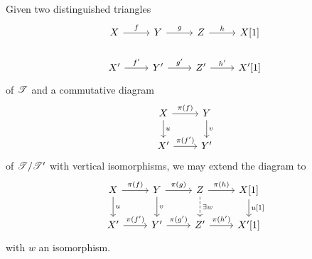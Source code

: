 \documentclass[dissertation.tex]{subfiles}
\begin{document}
\begin{lem}
  Given two distinguished triangles
  $$\begin{tikzcd}
    X \arrow{r}{f} & Y \arrow{r}{g} & Z \arrow{r}{h} & X[1]\\
    X^\prime \arrow{r}{f^\prime} & Y^\prime \arrow{r}{g^\prime} & Z^\prime \arrow{r}{h^\prime} & X^\prime[1]
  \end{tikzcd}$$
  of $\mathscr{T}$ and a commutative diagram
  $$\begin{tikzcd}
    X \arrow{r}{\pi(f)}\arrow{d}{u} & Y\arrow{d}{v}\\
    X^\prime \arrow{r}{\pi(f^\prime)} & Y^\prime
  \end{tikzcd}$$
  of $\mathscr{T}/\mathscr{T}^\prime$ with vertical isomorphisms, we may extend the diagram to 
  $$\begin{tikzcd}
    X \arrow{r}{\pi(f)}\arrow{d}{u} & Y\arrow{d}{v} \arrow{r}{\pi(g)} & Z \arrow{r}{\pi(h)}\arrow[dashed]{d}{\exists w} & X[1] \arrow{d}{u[1]}\\
    X^\prime \arrow{r}{\pi(f^\prime)} & Y^\prime \arrow{r}{\pi(g^\prime)} & Z^\prime \arrow{r}{\pi(h^{\prime})} & X^\prime[1]
  \end{tikzcd}$$
  with $w$ an isomorphism.
  

\end{lem}
\end{document}
